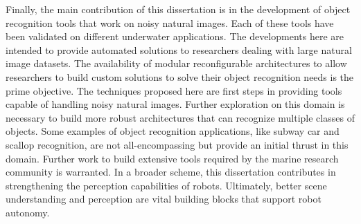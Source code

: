 \documentclass {udthesis}
\begin{document}
Finally, the main contribution of this dissertation is in the development of object recognition tools that work on noisy natural images. Each of these tools have been validated on different underwater applications. The developments here are intended to provide automated solutions to researchers dealing with large natural image datasets.
The availability of modular reconfigurable architectures to allow researchers to build custom solutions to solve their object recognition needs is the prime objective. The techniques proposed here are first steps in providing tools capable of handling noisy natural images. Further exploration on this domain is necessary to build more robust architectures that can recognize multiple classes of objects. Some examples of object recognition applications, like subway car and scallop recognition, are not all-encompassing but provide an initial thrust in this domain. Further work to build extensive tools required by the marine research community is warranted. In a broader scheme, this dissertation contributes in strengthening the perception capabilities of robots. Ultimately, better scene understanding and perception are vital building blocks that support robot autonomy.


\printglossary[type=\acronymtype]                  
\end{document}
